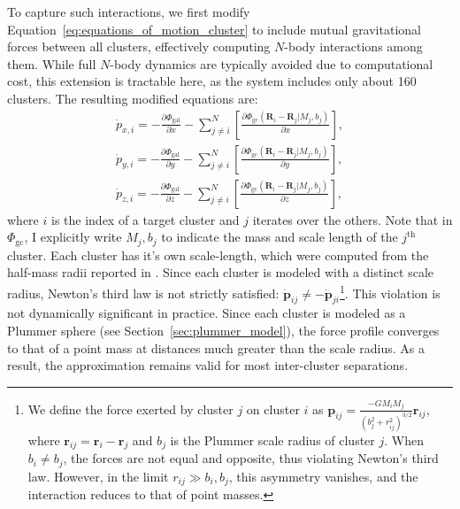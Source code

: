         To capture such interactions, we first modify Equation~\ref{eq:equations_of_motion_cluster} to include mutual gravitational forces between all clusters, effectively computing $N$-body interactions among them. While full $N$-body dynamics are typically avoided due to computational cost, this extension is tractable here, as the system includes only about 160 clusters. The resulting modified equations are:
        \begin{equation}\label{eq:equations_of_motion_cluster_n_body}
            \begin{aligned}
                \dot{p}_{x,i} = - \frac{\partial \Phi_\mathrm{gal}}{\partial x} - \sum_{j\neq i}^N \left[\frac{\partial \Phi_\mathrm{gc}\left(\mathbf{R}_i-\mathbf{R}_j|M_j,b_j\right)}{\partial x}\right], \\ 
                \dot{p}_{y,i} = - \frac{\partial \Phi_\mathrm{gal}}{\partial y} - \sum_{j\neq i}^N \left[\frac{\partial \Phi_\mathrm{gc}\left(\mathbf{R}_i-\mathbf{R}_j|M_j,b_j\right)}{\partial y}\right], \\ 
                \dot{p}_{z,i} = - \frac{\partial \Phi_\mathrm{gal}}{\partial z} - \sum_{j\neq i}^N \left[\frac{\partial \Phi_\mathrm{gc}\left(\mathbf{R}_i-\mathbf{R}_j|M_j,b_j\right)}{\partial z}\right],
            \end{aligned}
        \end{equation}
        where $i$ is the index of a target cluster and $j$ iterates over the others. Note that in $\Phi_{\mathrm{gc}}$, I explicitly write $M_j,b_j$ to indicate the mass and scale length of the $j^{\mathrm{th}}$ cluster. Each cluster has it's own scale-length, which were computed from the half-mass radii reported in \citet{2018MNRAS.478.1520B}. Since each cluster is modeled with a distinct scale radius, Newton's third law is not strictly satisfied: $\dot{\mathbf{p}}_{ij} \neq -\dot{\mathbf{p}}_{ji}$\footnote{We define the force exerted by cluster $j$ on cluster $i$ as $\mathbf{p}_{ij} = \frac{-G M_i M_j}{\left(b_j^2 + r_{ij}^2\right)^{3/2}} \mathbf{r}_{ij}$, where $\mathbf{r}_{ij} = \mathbf{r}_i - \mathbf{r}_j$ and $b_j$ is the Plummer scale radius of cluster $j$. When $b_i \neq b_j$, the forces are not equal and opposite, thus violating Newton's third law. However, in the limit $r_{ij} \gg b_i, b_j$, this asymmetry vanishes, and the interaction reduces to that of point masses.}. This violation is not dynamically significant in practice. Since each cluster is modeled as a Plummer sphere (see Section~\ref{sec:plummer_model}), the force profile converges to that of a point mass at distances much greater than the scale radius. As a result, the approximation remains valid for most inter-cluster separations.

